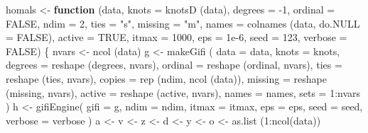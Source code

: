 \documentclass[
  12pt,
]{book}
\newenvironment{Shaded}{\begin{snugshade}}{\end{snugshade}}
\newcommand{\AttributeTok}[1]{\textcolor[rgb]{0.77,0.63,0.00}{#1}}
\newcommand{\ConstantTok}[1]{\textcolor[rgb]{0.00,0.00,0.00}{#1}}
\newcommand{\ControlFlowTok}[1]{\textcolor[rgb]{0.13,0.29,0.53}{\textbf{#1}}}
\newcommand{\DecValTok}[1]{\textcolor[rgb]{0.00,0.00,0.81}{#1}}
\newcommand{\FloatTok}[1]{\textcolor[rgb]{0.00,0.00,0.81}{#1}}
\newcommand{\FunctionTok}[1]{\textcolor[rgb]{0.00,0.00,0.00}{#1}}
\newcommand{\NormalTok}[1]{#1}
\newcommand{\OtherTok}[1]{\textcolor[rgb]{0.56,0.35,0.01}{#1}}
\newcommand{\SpecialCharTok}[1]{\textcolor[rgb]{0.00,0.00,0.00}{#1}}
\newcommand{\StringTok}[1]{\textcolor[rgb]{0.31,0.60,0.02}{#1}}
\begin{document}
\begin{Shaded}
\begin{Highlighting}[]
\NormalTok{homals }\OtherTok{\textless{}{-}}
  \ControlFlowTok{function}\NormalTok{ (data,}
            \AttributeTok{knots =} \FunctionTok{knotsD}\NormalTok{ (data),}
            \AttributeTok{degrees =} \SpecialCharTok{{-}}\DecValTok{1}\NormalTok{,}
            \AttributeTok{ordinal =} \ConstantTok{FALSE}\NormalTok{,}
            \AttributeTok{ndim =} \DecValTok{2}\NormalTok{,}
            \AttributeTok{ties =} \StringTok{"s"}\NormalTok{,}
            \AttributeTok{missing =} \StringTok{"m"}\NormalTok{,}
            \AttributeTok{names =} \FunctionTok{colnames}\NormalTok{ (data, }\AttributeTok{do.NULL =} \ConstantTok{FALSE}\NormalTok{),}
            \AttributeTok{active =} \ConstantTok{TRUE}\NormalTok{,}
            \AttributeTok{itmax =} \DecValTok{1000}\NormalTok{,}
            \AttributeTok{eps =} \FloatTok{1e{-}6}\NormalTok{,}
            \AttributeTok{seed =} \DecValTok{123}\NormalTok{,}
            \AttributeTok{verbose =} \ConstantTok{FALSE}\NormalTok{)  \{}
\NormalTok{    nvars }\OtherTok{\textless{}{-}} \FunctionTok{ncol}\NormalTok{ (data)}
\NormalTok{    g }\OtherTok{\textless{}{-}} \FunctionTok{makeGifi}\NormalTok{ (}
      \AttributeTok{data =}\NormalTok{ data,}
      \AttributeTok{knots =}\NormalTok{ knots,}
      \AttributeTok{degrees =} \FunctionTok{reshape}\NormalTok{ (degrees, nvars),}
      \AttributeTok{ordinal =} \FunctionTok{reshape}\NormalTok{ (ordinal, nvars),}
      \AttributeTok{ties =} \FunctionTok{reshape}\NormalTok{ (ties, nvars),}
      \AttributeTok{copies =} \FunctionTok{rep}\NormalTok{ (ndim, }\FunctionTok{ncol}\NormalTok{ (data)),}
      \AttributeTok{missing =} \FunctionTok{reshape}\NormalTok{ (missing, nvars),}
      \AttributeTok{active =} \FunctionTok{reshape}\NormalTok{ (active, nvars),}
      \AttributeTok{names =}\NormalTok{ names,}
      \AttributeTok{sets =} \DecValTok{1}\SpecialCharTok{:}\NormalTok{nvars}
\NormalTok{    )}
\NormalTok{    h }\OtherTok{\textless{}{-}} \FunctionTok{gifiEngine}\NormalTok{(}
      \AttributeTok{gifi =}\NormalTok{ g,}
      \AttributeTok{ndim =}\NormalTok{ ndim,}
      \AttributeTok{itmax =}\NormalTok{ itmax,}
      \AttributeTok{eps =}\NormalTok{ eps,}
      \AttributeTok{seed =}\NormalTok{ seed,}
      \AttributeTok{verbose =}\NormalTok{ verbose}
\NormalTok{    )}
\NormalTok{    a }\OtherTok{\textless{}{-}}\NormalTok{ v }\OtherTok{\textless{}{-}}\NormalTok{ z }\OtherTok{\textless{}{-}}\NormalTok{ d }\OtherTok{\textless{}{-}}\NormalTok{ y }\OtherTok{\textless{}{-}}\NormalTok{ o }\OtherTok{\textless{}{-}} \FunctionTok{as.list}\NormalTok{ (}\DecValTok{1}\SpecialCharTok{:}\FunctionTok{ncol}\NormalTok{(data))}

\end{Highlighting}
\end{Shaded}
\end{document}
